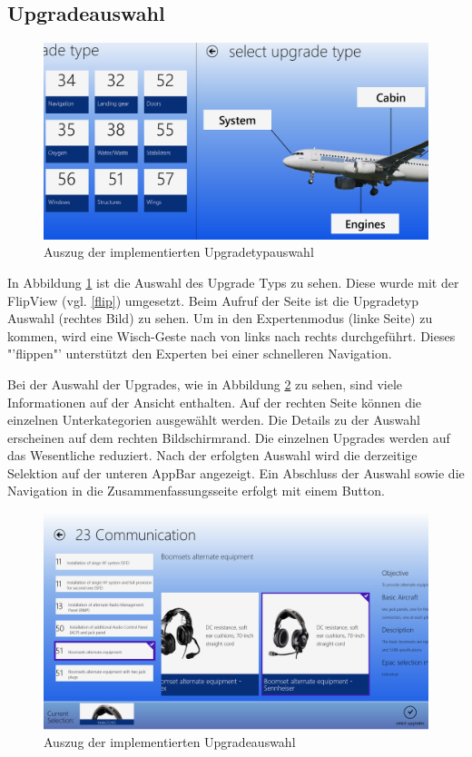 \subsection{Upgradeauswahl}
\begin{figure}[H]
\centering
\includegraphics[width=\hsize]{images/impl/select_upgrade_type_impl}
\caption{Auszug der implementierten Upgradetypauswahl}
\label{upgradeTypeSelectionImpl}
\end{figure}
In Abbildung \ref{upgradeTypeSelectionImpl} ist die Auswahl des Upgrade Typs zu sehen. Diese wurde mit der FlipView (vgl. \ref{flip}) umgesetzt. Beim Aufruf der Seite ist die Upgradetyp Auswahl (rechtes Bild) zu sehen.  Um in den Expertenmodus (linke Seite) zu kommen, wird eine Wisch-Geste nach von links nach rechts durchgeführt. Dieses "'flippen"' unterstützt den Experten bei einer schnelleren Navigation.


Bei der Auswahl der Upgrades, wie in Abbildung \ref{upgradeSelectionImpl} zu sehen, sind viele Informationen auf der Ansicht enthalten. Auf der rechten Seite können die einzelnen Unterkategorien ausgewählt werden. Die Details zu der Auswahl erscheinen auf dem rechten Bildschirmrand. Die einzelnen Upgrades werden auf das Wesentliche reduziert. Nach der erfolgten Auswahl wird die derzeitige Selektion auf der unteren AppBar angezeigt. Ein Abschluss der Auswahl sowie die Navigation in die Zusammenfassungsseite erfolgt mit einem Button. \par 
\begin{figure}[H]
\centering
\includegraphics[width=\hsize]{images/impl/select_upgrade_impl}
\caption{Auszug der implementierten Upgradeauswahl}
\label{upgradeSelectionImpl}
\end{figure}

